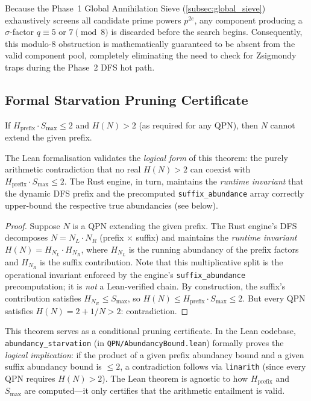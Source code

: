 Because the Phase~1 Global Annihilation Sieve (\cref{subsec:global_sieve})
exhaustively screens all candidate prime powers $p^{2e}$, any component producing
a $\sigma$-factor $q \equiv 5$ or $7 \pmod 8$ is discarded before the search begins.
Consequently, this modulo-8 obstruction is mathematically guaranteed to be absent
from the valid component pool, completely eliminating the need to check for Zsigmondy
traps during the Phase~2 DFS hot path.


\subsection{Formal Starvation Pruning Certificate}
\label{subsec:starvation_certificate}

\begin{theorem}\label{thm:starvation}
If $H_{\mathrm{prefix}} \cdot S_{\max} \le 2$ and
$H(N) > 2$ (as required for any QPN), then $N$ cannot extend
the given prefix.
\end{theorem}

\noindent
The Lean formalisation validates the \emph{logical form} of this theorem:
the purely arithmetic contradiction that no real $H(N) > 2$ can coexist with
$H_{\mathrm{prefix}} \cdot S_{\max} \le 2$.  The Rust engine, in turn,
maintains the \emph{runtime invariant} that the dynamic DFS prefix and the
precomputed \texttt{suffix\_abundance} array correctly upper-bound the
respective true abundancies (see below).

\begin{proof}
Suppose $N$ is a QPN extending the given prefix.  The Rust engine's DFS
decomposes $N = N_L \cdot N_R$ (prefix $\times$ suffix) and maintains the
\emph{runtime invariant} $H(N) = H_{N_L} \cdot H_{N_R}$, where $H_{N_L}$
is the running abundancy of the prefix factors and $H_{N_R}$ is the suffix
contribution.  Note that this multiplicative split is the operational
invariant enforced by the engine's \texttt{suffix\_abundance} precomputation;
it is \emph{not} a Lean-verified chain.  By construction, the suffix's
contribution satisfies $H_{N_R} \le S_{\max}$, so
$H(N) \le H_{\mathrm{prefix}} \cdot S_{\max} \le 2$.
But every QPN satisfies $H(N) = 2 + 1/N > 2$: contradiction.
\end{proof}

This theorem serves as a conditional pruning certificate. In the Lean codebase,
\texttt{abundancy\_\allowbreak{}starvation} (in \texttt{QPN/AbundancyBound.lean}) formally
proves the \emph{logical implication}: if the product of a given prefix abundancy bound and
a given suffix abundancy bound is $\le 2$, a contradiction follows via
\texttt{linarith} (since every QPN requires $H(N) > 2$).
The Lean theorem is agnostic to how $H_{\mathrm{prefix}}$ and $S_{\max}$ are
computed---it only certifies that the arithmetic entailment is valid.


